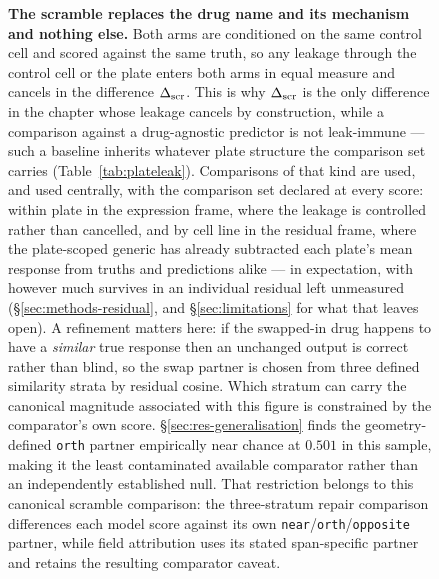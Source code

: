 \begin{figure}[htbp]
\begin{tikzpicture}
\end{tikzpicture}
\caption[The scramble ablation]{\textbf{The scramble replaces the drug name and its mechanism and
nothing else.} Both arms are conditioned on the same control cell and scored against the same truth,
so any leakage through the control cell or the plate enters both arms in equal measure and cancels in
the difference $\Delta_{\textrm{scr}}$. This is why $\Delta_{\textrm{scr}}$ is the only difference in the chapter whose leakage cancels
by construction, while a comparison against a drug-agnostic predictor is not leak-immune --- such a
baseline inherits whatever plate structure the comparison set carries
(Table~\ref{tab:plateleak}). Comparisons of that kind are used, and used centrally, with the
comparison set declared at every score: within plate in the expression frame, where the leakage is
controlled rather than cancelled, and by cell line in the residual frame, where the plate-scoped
generic has already subtracted each plate's mean response from truths and predictions alike --- in
expectation, with however much survives in an individual residual left unmeasured
(\S\ref{sec:methods-residual}, and \S\ref{sec:limitations} for what that leaves open).
A refinement matters here: if the swapped-in drug happens to have a
\emph{similar} true response then an unchanged output is correct rather than blind, so the swap
partner is chosen from three defined similarity strata by residual cosine. Which stratum can carry
the canonical magnitude associated with this figure is constrained by the comparator's own score.
\S\ref{sec:res-generalisation} finds the geometry-defined \texttt{orth} partner empirically near
chance at $0.501$ in this sample, making it the least contaminated available comparator rather than
an independently established null. That restriction belongs to this canonical scramble comparison:
the three-stratum repair comparison differences each model score against its own
\texttt{near}/\texttt{orth}/\texttt{opposite} partner, while field attribution uses its stated
span-specific partner and retains the resulting comparator caveat.}
\label{fig:scramble}
\end{figure}
